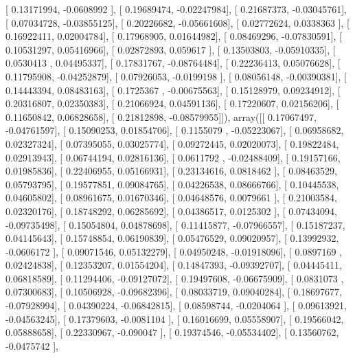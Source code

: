 \documentclass{article}
\begin{document}
       [ 0.13171994, -0.0608992 ],
       [ 0.19689474, -0.02247984],
       [ 0.21687373, -0.03045761],
       [ 0.07034728, -0.03855125],
       [ 0.20226682, -0.05661608],
       [ 0.02772624,  0.0338363 ],
       [ 0.16922411,  0.02004784],
       [ 0.17968905,  0.01644982],
       [ 0.08469296, -0.07830591],
       [ 0.10531297,  0.05416966],
       [ 0.02872893,  0.059617  ],
       [ 0.13503803, -0.05910335],
       [ 0.0530413 ,  0.04495337],
       [ 0.17831767, -0.08764484],
       [ 0.22236413,  0.05076628],
       [ 0.11795908, -0.04252879],
       [ 0.07926053, -0.0199198 ],
       [ 0.08056148, -0.00390381],
       [ 0.14443394,  0.08483163],
       [ 0.1725367 , -0.00675563],
       [ 0.15128979,  0.09234912],
       [ 0.20316807,  0.02350383],
       [ 0.21066924,  0.04591136],
       [ 0.17220607,  0.02156206],
       [ 0.11650842,  0.06828658],
       [ 0.21812898, -0.08579955]]), array([[ 0.17067497, -0.04761597],
       [ 0.15090253,  0.01854706],
       [ 0.1155079 , -0.05223067],
       [ 0.06958682,  0.02327324],
       [ 0.07395055,  0.03025774],
       [ 0.09272445,  0.02020073],
       [ 0.19822484,  0.02913943],
       [ 0.06744194,  0.02816136],
       [ 0.0611792 , -0.02488409],
       [ 0.19157166,  0.01985836],
       [ 0.22406955,  0.05166931],
       [ 0.23134616,  0.0818462 ],
       [ 0.08463529,  0.05793795],
       [ 0.19577851,  0.09084765],
       [ 0.04226538,  0.08666766],
       [ 0.10445538,  0.04605802],
       [ 0.08961675,  0.01670346],
       [ 0.04648576,  0.0079661 ],
       [ 0.21003584,  0.02320176],
       [ 0.18748292,  0.06285692],
       [ 0.04386517,  0.0125302 ],
       [ 0.07434094, -0.09735498],
       [ 0.15054804,  0.04878698],
       [ 0.11415877, -0.07966557],
       [ 0.15187237,  0.04145643],
       [ 0.15748854,  0.06190839],
       [ 0.05476529,  0.09020957],
       [ 0.13992932, -0.0606172 ],
       [ 0.09071546,  0.05132279],
       [ 0.04950248, -0.01918096],
       [ 0.0897169 ,  0.02424838],
       [ 0.12353207,  0.01554204],
       [ 0.14847393, -0.09392707],
       [ 0.04445411,  0.06818589],
       [ 0.11294406, -0.09127072],
       [ 0.19497608, -0.06675909],
       [ 0.0831073 ,  0.07300683],
       [ 0.10506928, -0.09682396],
       [ 0.08033719,  0.09040284],
       [ 0.18697677, -0.07928994],
       [ 0.04390224, -0.06842815],
       [ 0.08598744, -0.0204064 ],
       [ 0.09613921, -0.04563245],
       [ 0.17379603, -0.0081104 ],
       [ 0.16016699,  0.05558907],
       [ 0.19566042,  0.05888658],
       [ 0.22330967, -0.090047  ],
       [ 0.19374546, -0.05534402],
       [ 0.13560762, -0.0475742 ],
\end{document}
